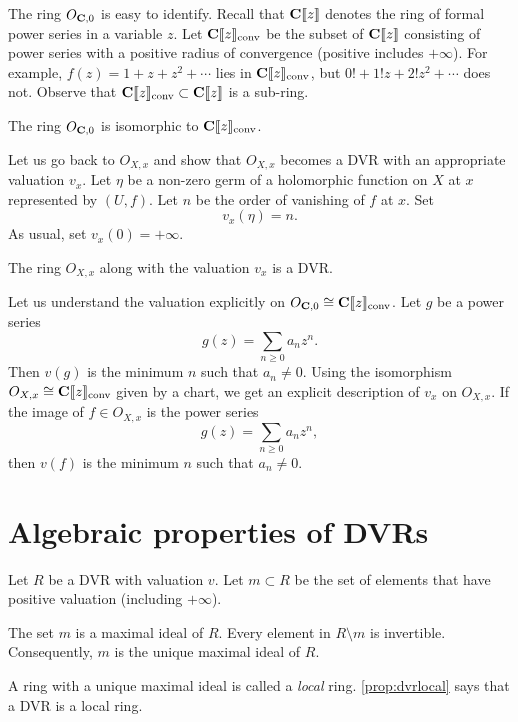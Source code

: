 \documentclass[12pt]{article}
\begin{document}
The ring $O_{{\bf C}, 0}$ is easy to identify.
Recall that ${\bf C}\llbracket z \rrbracket$ denotes the ring of formal power series in a variable $z$.
Let ${\bf C}\llbracket z \rrbracket_{\rm conv}$ be the subset of ${\bf C}\llbracket z \rrbracket$ consisting of power series with a positive radius of convergence (positive includes $+\infty$).
For example, $f(z) = 1 + z + z^2 + \cdots$ lies in ${\bf C}\llbracket z \rrbracket_{\rm conv}$, but $0! + 1! z + 2! z^2 + \cdots$ does not.
Observe that ${\bf C}\llbracket z \rrbracket_{\rm conv} \subset {\bf C} \llbracket z \rrbracket$ is a sub-ring.
\begin{proposition}
  The ring $O_{{\bf C}, 0}$ is isomorphic to ${\bf C}\llbracket z \rrbracket_{\rm conv}$.
\end{proposition}

Let us go back to $O_{X,x}$ and show that $O_{X,x}$ becomes a DVR with an appropriate valuation $v_x$.
Let $\eta$ be a non-zero germ of a holomorphic function on $X$ at $x$ represented by $(U, f)$.
Let $n$ be the order of vanishing of $f$ at $x$.
Set
\[ v_x(\eta) = n.\]
As usual, set $v_x(0) = +\infty$.
\begin{proposition}
  The ring $O_{X,x}$ along with the valuation $v_x$ is a DVR.
\end{proposition}

Let us understand the valuation explicitly on $O_{{\bf C}, 0} \cong {\bf C}\llbracket z \rrbracket_{\rm conv}$.
Let $g$ be a power series
\[ g(z) = \sum_{n \geq 0} a_n z^n.\]
Then $v(g)$ is the minimum $n$ such that $a_n \neq 0$.
Using the isomorphism $O_{X,x} \cong {\bf C}\llbracket z \rrbracket_{\rm conv}$ given by a chart, we get an explicit description of $v_x$ on $O_{X,x}$.
If the image of $f \in O_{X,x}$ is the power series
\[ g(z) = \sum_{n \geq 0} a_n z^n,\]
then $v(f)$ is the minimum $n$ such that $a_n \neq 0$.

\section{Algebraic properties of DVRs}
Let $R$ be a DVR with valuation $v$.
Let $m \subset R$ be the set of elements that have positive valuation (including $+\infty$).
\begin{proposition}\label{prop:dvrlocal}
  The set $m$ is a maximal ideal of $R$.
  Every element in $R \setminus m$ is invertible.
  Consequently, $m$ is the unique maximal ideal of $R$.
\end{proposition}
A ring with a unique maximal ideal is called a \emph{local} ring.
\autoref{prop:dvrlocal} says that a DVR is a local ring.
\end{document}
